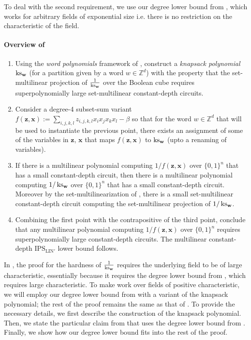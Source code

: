 \documentclass[11pt]{article}
\newcommand{\Boo}{\{0,1 \}}
\newcommand{\IPSLINp}{\mathrm{IPS}_{\mathrm{LIN}'}}
\begin{document}
To deal with the second requirement, we use our degree lower bound from , which works for arbitrary fields of exponential size i.e. there is no restriction on the characteristic of the field. 

\paragraph{Overview of \cite{GHT}}

\begin{enumerate}
    \item Using the \emph{word polynomials} framework of \cite{LST}, construct a \emph{knapsack polynomial} $\operatorname{ks}_{\mathbf{w}}$ (for a partition given by a word $w \in \mathbb{Z}^d$) with the property that the set-multilinear projection of $\frac{1}{\operatorname{ks}_{\mathbf{w}}}$ over the Boolean cube requires superpolynomially large set-multilinear constant-depth circuits.
    \item Consider a degree-4 subset-sum variant $f(\mathbf{z},\mathbf{x}) := \sum_{i,j,k,l}z_{i,j,k,l}x_ix_jx_kx_l - \beta$ so that for the word $w\in \mathbb{Z}^d$ that will be used to instantiate the previous point, there exists an assignment of some of the variables in $\mathbf{z}$, $\mathbf{x}$ that maps $f(\mathbf{z},\mathbf{x})$ to $\operatorname{ks}_{\mathbf{w}}$ (upto a renaming of variables).
    \item If there is a multilinear polynomial computing $1/f(\mathbf{z},\mathbf{x})$ over $\Boo^n$ that has a small constant-depth circuit, then there is a multilinear polynomial computing $1/\operatorname{ks}_{\mathbf{w}}$ over $\Boo^n$ that has a small constant-depth circuit. Moreover by the set-multilinearization of \cite{LST}, there is a small set-multilinear constant-depth circuit computing the set-multilinear projection of $1/\operatorname{ks}_{\mathbf{w}}$. 
    \item Combining the first point with the contrapositive of the third point, conclude that any multilinear polynomial computing $1/f(\mathbf{z},\mathbf{x})$ over $\Boo^n$ requires superpolynomially large constant-depth circuits. The multilinear constant-depth $\IPSLINp$ lower bound follows.
\end{enumerate}

In \cite{GHT}, the proof for the hardness of $\frac{1}{\operatorname{ks}_{\mathbf{w}}}$ requires the underlying field to be of large characteristic, essentially because it requires the degree lower bound from \cite{FSTW21}, which requires large characteristic. To make  work over fields of positive characteristic, we will employ our degree lower bound from  with a variant of the knapsack polynomial; the rest of the proof remains the same as that of . To provide the necessary details, we first describe the construction of the knapsack polynomial. Then, we state the particular claim from \cite{GHT} that uses the degree lower bound from \cite{FSTW21}. Finally, we show how our degree lower bound  fits into the rest of the proof. 
\end{document}
